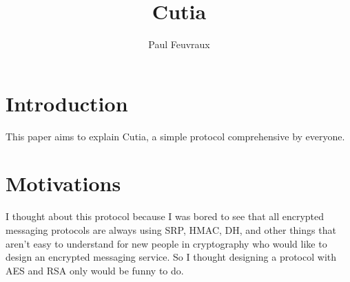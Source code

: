 \documentclass[a4paper,10pt]{article}
\title{Cutia}
\author{Paul Feuvraux}
\begin{document}
\maketitle

\section{Introduction}
This paper aims to explain Cutia, a simple protocol comprehensive by everyone.

\section{Motivations}
I thought about this protocol because I was bored to see that all encrypted messaging protocols are always using SRP, HMAC, DH, and other things that aren't easy to understand for new people in cryptography who would like to design an encrypted messaging service. So I thought designing a protocol with AES and RSA only would be funny to do.
\end{document}
